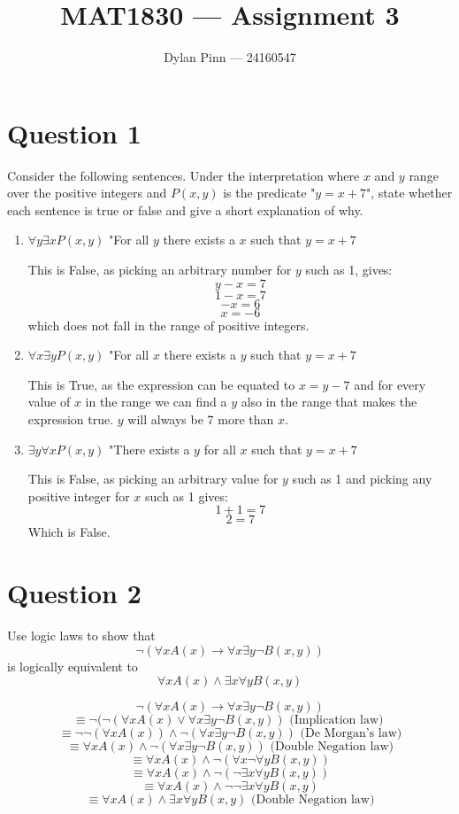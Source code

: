 \documentclass[11pt]{article}
\begin{document}
\title{MAT1830 --- Assignment 3}
\author{Dylan Pinn --- 24160547}
\maketitle

\section*{Question 1}
Consider the following sentences. Under the interpretation where $x$ and $y$ range over the positive integers and $P(x, y)$ is the predicate "$y=x+7$", state whether each sentence is true or false and give a short explanation of why.

\begin{enumerate}[label= (\alph*)]
	\item $\forall y \exists x P(x, y)$
	"For all $y$ there exists a $x$ such that $y = x + 7$

	This is False, as picking an arbitrary number for $y$ such as 1, gives:
	$$y - x = 7$$
	$$1 - x = 7$$
	$$-x = 6$$
	$$x = -6$$
	which does not fall in the range of positive integers.
	\item $\forall x \exists y P(x, y)$
	"For all $x$ there exists a $y$ such that $y = x + 7$

	This is True, as the expression can be equated to $x = y - 7$ and for every value of $x$ in the range we can find a $y$ also in the range that makes the expression true. $y$ will always be 7 more than $x$.
	\item $\exists y \forall x P(x, y)$
	"There exists a $y$ for all $x$ such that $y = x + 7$

	This is False, as picking an arbitrary value for $y$ such as 1 and picking any positive integer for $x$ such as 1 gives:
	$$1 + 1 = 7$$
	$$2 = 7$$
	Which is False.

\end{enumerate}
\break

\section*{Question 2}
Use logic laws to show that
$$\neg (\forall xA(x) \to \forall x \exists y \neg B(x, y))$$
is logically equivalent to
$$\forall xA(x) \land \exists x \forall y B(x, y)$$

$$\neg (\forall xA(x) \to \forall x \exists y \neg B(x, y))$$
$$\equiv \neg (\neg (\forall xA(x) \lor \forall x \exists y \neg B(x, y)) \text{ (Implication law) }$$
$$\equiv \neg \neg(\forall xA(x)) \land \neg(\forall x\exists y \neg B(x, y)) \text{ (De Morgan's law)}$$
$$\equiv \forall xA(x) \land \neg(\forall x\exists y \neg B(x, y)) \text{ (Double Negation law)} $$
$$\equiv \forall xA(x) \land \neg(\forall x \neg \forall yB(x, y))$$
$$\equiv \forall xA(x) \land \neg(\neg \exists x \forall yB(x, y))$$
$$\equiv \forall xA(x) \land \neg\neg \exists x \forall yB(x, y)$$
$$\equiv \forall xA(x) \land \exists x \forall yB(x, y) \text{ (Double Negation law)} $$
\end{document}
